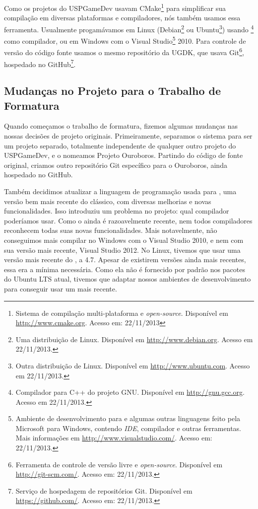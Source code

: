   Como os projetos do USPGameDev usavam CMake\footnote{Sistema de compilação multi-plataforma
  e \textit{open-source}. Disponível em \url{http://www.cmake.org}. Acesso em: 22/11/2013} 
  para simplificar sua compilação em diversas plataformas e compiladores, nós também usamos essa ferramenta.
  Usualmente progamávamos em Linux (Debian\footnote{Uma distribuição de Linux. Disponível em 
  \url{http://www.debian.org}. Acesso em 22/11/2013.} ou Ubuntu\footnote{Outra distribuição de Linux. 
  Disponível em \url{http://www.ubuntu.com}. Acesso em 22/11/2013.}) usando \footnote{
  Compilador para C++ do projeto GNU. Disponível em \url{http://gnu.gcc.org}. Acesso em 22/11/2013.}
  como compilador, ou em Windows com o Visual Studio\footnote{Ambiente de desenvolvimento para
  \CXX{} e algumas outras linguagens feito pela Microsoft para Windows, contendo \textit{IDE}, 
  compilador e outras ferramentas. Mais informações em \url{http://www.visualstudio.com/}. 
  Acesso em: 22/11/2013.} 2010. Para controle de versão do código fonte usamos o mesmo repositório 
  da UGDK, que usava Git\footnote{Ferramenta de controle de versão livre e \textit{open-source}.
  Disponível em \url{http://git-scm.com/}. Acesso em: 22/11/2013.}, hospedado no GitHub\footnote{
  Serviço de hospedagem de repositórios Git. Disponível em \url{https://github.com/}. 
  Acesso em: 22/11/2013.}.

  \subsection{Mudanças no Projeto para o Trabalho de Formatura}
  Quando começamos o trabalho de formatura, fizemos algumas mudanças nas nossas
  decisões de projeto originais. Primeiramente, separamos o sistema para ser um
  projeto separado, totalmente independente de qualquer outro projeto do
  USPGameDev, e o nomeamos Projeto Ouroboros. Partindo do código de fonte
  original, criamos outro repositório Git específico para o Ouroboros, ainda
  hospedado no GitHub.
  
  Também decidimos atualizar a linguagem de programação usada para ,
  uma versão bem mais recente do \CXX{} clássico, com diversas melhorias e
  novas funcionalidades. Isso introduziu um problema no projeto: qual compilador
  poderíamos usar. Como o  ainda é razoavelmente recente, nem todos
  compiladores reconhecem todas suas novas funcionalidades. Mais notavelmente,
  não conseguimos mais compilar no Windows com o Visual Studio 2010, e nem com
  sua versão mais recente, Visual Studio 2012. No Linux, tivemos que usar uma
  versão mais recente do , a 4.7. Apesar de existirem versões ainda mais 
  recentes, essa era a mínima necessária. Como ela não é fornecido por padrão
  nos pacotes do Ubuntu LTS\footnotemark{} atual, tivemos que adaptar nossos
  ambientes de desenvolvimento para conseguir usar um  mais recente.

